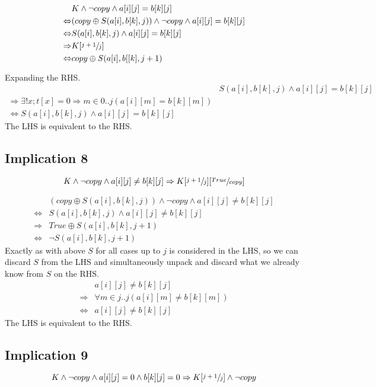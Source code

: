\documentclass[a4paper]{article}
\begin{document}
\begin{align*}
		& K \land \neg copy \land a[i][j] = b[k][j] \\
		\Leftrightarrow & (copy \oplus S(a[i], b[k], j)) \land \neg copy \land a[i][j] = b[k][j] \\
		\Leftrightarrow & S(a[i], b[k], j) \land a[i][j] = b[k][j] \\
		\Rightarrow & K[\sfrac{j+1}{j}] \\
		\Leftrightarrow & copy \oplus S(a[i], b[[k], j+1)
\end{align*}

Expanding the RHS.
\begin{align*}
		& S(a[i], b[k], j) \land a[i][j] = b[k][j] \\
		\Rightarrow \exists! x; t[x] = 0 \Rightarrow m \in 0..j(a[i][m] = b[k][m]) \\
		\Leftrightarrow S(a[i], b[k], j) \land a[i][j] = b[k][j] 
\end{align*}
The LHS is equivalent to the RHS.



\subsection{Implication 8}
$$ K \land \neg copy \land a[i][j] \neq b[k][j] \Rightarrow K[\sfrac{j+1}{j}][\sfrac{True}{copy}] $$

\begin{align*}
		& (copy \oplus S(a[i], b[k], j)) \land \neg copy \land a[i][j] \neq b[k][j] \\
		\Leftrightarrow & S(a[i], b[k], j) \land a[i][j] \neq b[k][j] \\
		\Rightarrow & True \oplus S(a[i], b[k], j+1) \\
		\Leftrightarrow & \neg S(a[i], b[k], j+1)
\end{align*}
Exactly as with above $S$ for all cases up to $j$ is considered in the LHS, so we can discard $S$ from the LHS and simultaneously unpack and discard what we already know from $S$ on the RHS. 
\begin{align*}
		& a[i][j] \neq b[k][j] \\
		\Rightarrow & \forall m \in j..j(a[i][m] \neq b[k][m]) \\
		\Leftrightarrow & a[i][j] \neq b[k][j]
\end{align*}
The LHS is equivalent to the RHS.

\subsection{Implication 9}
$$ K \land \neg copy \land a[i][j] = 0 \land b[k][j] = 0 \Rightarrow K[\sfrac{j+1}{j}] \land \neg copy$$
\end{document}
